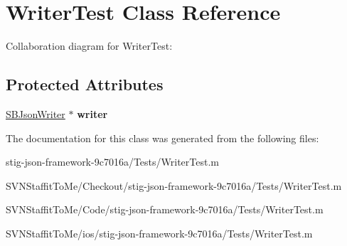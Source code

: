 \hypertarget{interface_writer_test}{
\section{\-Writer\-Test \-Class \-Reference}
\label{interface_writer_test}
}


\-Collaboration diagram for \-Writer\-Test\-:
\subsection*{\-Protected \-Attributes}
\begin{DoxyCompactItemize}
\item 
\hypertarget{interface_writer_test_a4e25f77902d7a3b78316df0c17aab4ce}{
\hyperlink{interface_s_b_json_writer}{\-S\-B\-Json\-Writer} $\ast$ {\bfseries writer}}
\label{interface_writer_test_a4e25f77902d7a3b78316df0c17aab4ce}

\end{DoxyCompactItemize}


\-The documentation for this class was generated from the following files\-:\begin{DoxyCompactItemize}
\item 
stig-\/json-\/framework-\/9c7016a/\-Tests/\-Writer\-Test.\-m\item 
\-S\-V\-N\-Staffit\-To\-Me/\-Checkout/stig-\/json-\/framework-\/9c7016a/\-Tests/\-Writer\-Test.\-m\item 
\-S\-V\-N\-Staffit\-To\-Me/\-Code/stig-\/json-\/framework-\/9c7016a/\-Tests/\-Writer\-Test.\-m\item 
\-S\-V\-N\-Staffit\-To\-Me/ios/stig-\/json-\/framework-\/9c7016a/\-Tests/\-Writer\-Test.\-m\end{DoxyCompactItemize}
